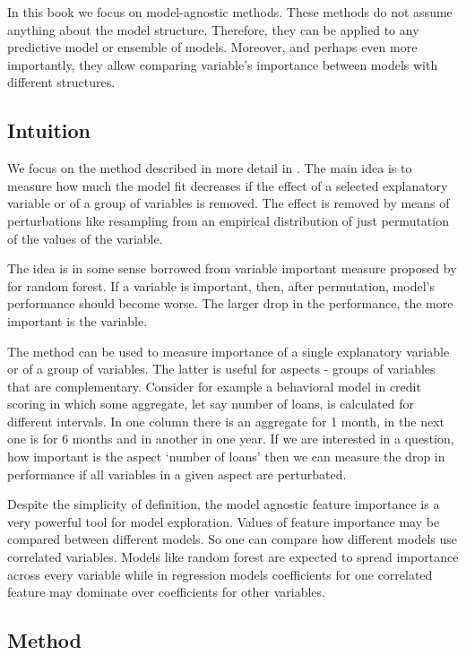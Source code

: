 \documentclass[12pt,]{krantz}
\begin{document}
In this book we focus on model-agnostic methods. These methods do not assume anything about the model structure. Therefore, they can be applied to any predictive model or ensemble of models. Moreover, and perhaps even more importantly, they allow comparing variable's importance between models with different structures.

\hypertarget{featureImportanceIntuition}{%
\subsection{Intuition}\label{featureImportanceIntuition}}

We focus on the method described in more detail in \citep{variableImportancePermutations}. The main idea is to measure how much the model fit decreases if the effect of a selected explanatory variable or of a group of variables is removed. The effect is removed by means of perturbations like resampling from an empirical distribution of just permutation of the values of the variable.

The idea is in some sense borrowed from variable important measure proposed by  for random forest. If a variable is important, then, after permutation, model's performance should become worse. The larger drop in the performance, the more important is the variable.

The method can be used to measure importance of a single explanatory variable or of a group of variables. The latter is useful for aspects - groups of variables that are complementary. Consider for example a behavioral model in credit scoring in which some aggregate, let say number of loans, is calculated for different intervals. In one column there is an aggregate for 1 month, in the next one is for 6 months and in another in one year. If we are interested in a question, how important is the aspect `number of loans' then we can measure the drop in performance if all variables in a given aspect are perturbated.

Despite the simplicity of definition, the model agnostic feature importance is a very powerful tool for model exploration. Values of feature importance may be compared between different models. So one can compare how different models use correlated variables. Models like random forest are expected to spread importance across every variable while in regression models coefficients for one correlated feature may dominate over coefficients for other variables.

\hypertarget{featureImportanceMethod}{%
\subsection{Method}\label{featureImportanceMethod}}
\end{document}
